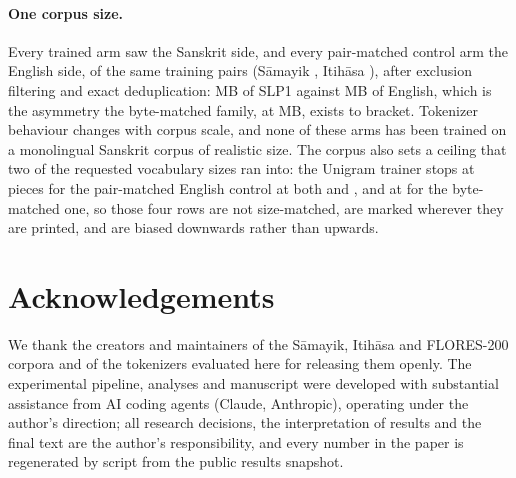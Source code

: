 \documentclass[11pt]{article}
\begin{document}
\paragraph{One corpus size.} Every trained arm saw the Sanskrit side, and every
pair-matched control arm the English side, of the same \numTrainPairsTotal{} training pairs
(S\=amayik \numSamayikTrain, Itih\=asa \numItihasaTrain), after exclusion filtering and
exact deduplication: \numBytesSanskritTrain{} MB of SLP1 against \numBytesEnglishTrain{} MB
of English, which is the asymmetry the byte-matched family, at
\numBytesEnglishBmTrain{} MB, exists to bracket. Tokenizer behaviour changes with corpus
scale, and none of these arms has been trained on a monolingual Sanskrit corpus of
realistic size. The corpus also sets a ceiling that two of the requested vocabulary sizes
ran into: the Unigram trainer stops at \numUnigramSixtyFourPieces{} pieces for the
pair-matched English control at both \numVocabLarge{} and \numVocabHuge, and at
\numUnigramBmPieces{} for the byte-matched one, so those four rows are not size-matched,
are marked wherever they are printed, and are biased downwards rather than upwards.

\iffinalmode
\section*{Acknowledgements}

We thank the creators and maintainers of the S\=amayik, Itih\=asa and FLORES-200 corpora
and of the tokenizers evaluated here for releasing them openly. The experimental pipeline,
analyses and manuscript were developed with substantial assistance from AI coding agents
(Claude, Anthropic), operating under the author's direction; all research decisions, the
interpretation of results and the final text are the author's responsibility, and every
number in the paper is regenerated by script from the public results snapshot.
\fi

\FloatBarrier



\appendix
\end{document}
